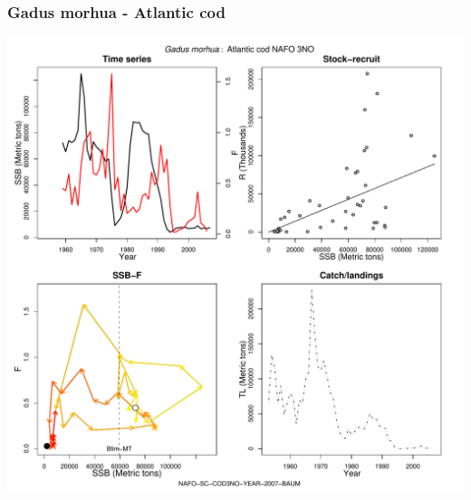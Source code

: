 \subsubsection{Gadus morhua - Atlantic cod}
\begin{center}
\includegraphics[width=1.2\textwidth]{../R/figures/NAFO-SC-COD3NO-YEAR-2007-BAUM.pdf}
\end{center}

